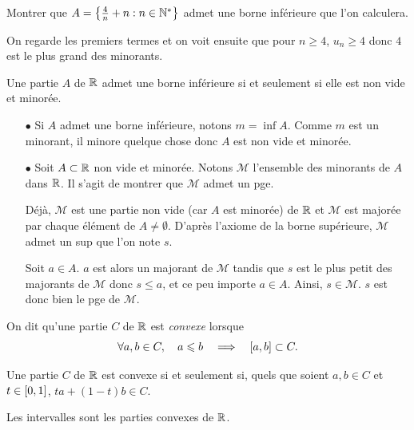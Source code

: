 \documentclass{magnolia}
\begin{document}
\begin{exoUnique}
\exo Montrer que $A=\left\{\frac{4}{n}+n : n\in{\mathbb{N}^*}\right\}$ admet une borne
  inférieure que l'on calculera.
\end{exoUnique}
\begin{sol}
On regarde les premiers termes et on voit ensuite que pour $n\geq 4$, $u_n\geq 4$ donc $4$ est le plus grand des minorants.
\end{sol}

\begin{proposition}
Une partie $A$ de $\mathbb{R}$ admet une borne inférieure si et seulement si elle est
non vide et minorée.
\end{proposition}

\begin{preuve}
\begin{itemize}
\item[$\bullet$]
Si $A$ admet une borne inférieure, notons $m=\inf A$. Comme $m$ est un minorant, il minore quelque chose donc $A$ est non vide et minorée.
\item [$\bullet$]
Soit $A\subset \mathbb{R}$ non vide et minorée. Notons $\mathcal{M}$ l'ensemble des minorants de $A$ dans $\mathbb{R}$. Il s'agit de montrer que $\mathcal{M}$ admet un pge.

Déjà, $\mathcal{M}$ est une partie non vide (car $A$ est minorée) de $\mathbb{R}$ et $\mathcal{M}$ est majorée par chaque élément de $A\neq \emptyset$. D'après l'axiome de la borne supérieure, $\mathcal{M}$ admet un sup que l'on note $s$.

Soit $a\in A$. $a$ est alors un majorant de $\mathcal{M}$ tandis que $s$ est le plus petit des majorants de $\mathcal{M}$ donc $s\leq a$, et ce peu importe $a\in A$. Ainsi, $s\in \mathcal{M}$. $s$ est donc bien le pge de $\mathcal{M}$.
\end{itemize}
\end{preuve}

\begin{definition}
On dit qu'une partie $C$ de $\mathbb{R}$ est \emph{convexe} lorsque
\[\forall a,b\in C ,\quad a\leqslant b \quad\Longrightarrow\quad [a,b]\subset C.\]
\end{definition}

\begin{remarqueUnique}
\remarque Une partie $C$ de $\mathbb{R}$ est convexe si et seulement si, quels
que soient $a,b\in C$ et $t\in\left[0,1\right]$, $ta+(1-t)b\in C$.
\end{remarqueUnique}

\begin{theoreme}
Les intervalles sont les parties convexes de $\mathbb{R}$.
\end{theoreme}
\end{document}
